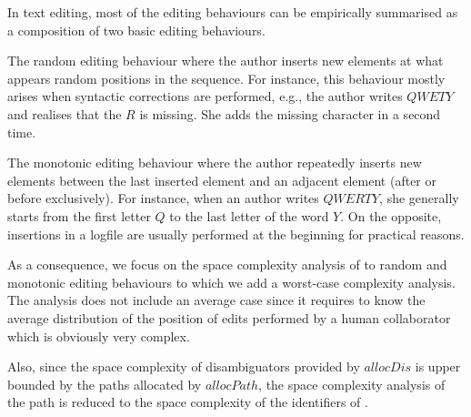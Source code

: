 


In text editing, most of the editing behaviours can be empirically summarised
as a composition of two basic editing behaviours.
\begin{inparaenum}[(i)]
\item The random editing behaviour where the author inserts new elements at
  what appears random positions in the sequence. For instance, this behaviour
  mostly arises when syntactic corrections are performed, e.g., the author
  writes $QWETY$ and realises that the $R$ is missing. She adds the missing
  character in a second time.
\item The monotonic editing behaviour where the author repeatedly inserts new
  elements between the last inserted element and an adjacent element (after or
  before exclusively). For instance, when an author writes $QWERTY$, she
  generally starts from the first letter $Q$ to the last letter of the word
  $Y$. On the opposite, insertions in a logfile are usually performed at the
  beginning for practical reasons.
\end{inparaenum}

As a consequence, we focus on the space complexity analysis of \LSEQ to
random and monotonic editing behaviours to which we add a worst-case complexity
analysis.  The analysis does not include an average case since it requires to
know the average distribution of the position of edits performed by a human
collaborator which is obviously very complex.

Also, since the space complexity of disambiguators provided by $allocDis$ is
upper bounded by the paths allocated by $allocPath$, the space complexity
analysis of the path is reduced to the space complexity of the identifiers of
\LSEQ.

